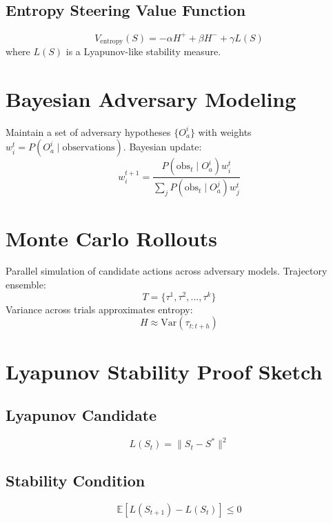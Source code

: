 \documentclass[12pt]{article}
\begin{document}
\subsection{Entropy Steering Value Function}
\begin{equation}
V_{\text{entropy}}(S) = -\alpha H^+ + \beta H^- + \gamma L(S)
\end{equation}
where $L(S)$ is a Lyapunov-like stability measure.

\section{Bayesian Adversary Modeling}
Maintain a set of adversary hypotheses $\{O_a^i\}$ with weights $w_i^t = P(O_a^i \mid \text{observations})$.
Bayesian update:
\begin{equation}
w_i^{t+1} = \frac{P(\text{obs}_t \mid O_a^i) w_i^t}{\sum_j P(\text{obs}_t \mid O_a^j) w_j^t}
\end{equation}

\section{Monte Carlo Rollouts}
Parallel simulation of candidate actions across adversary models.
Trajectory ensemble:
\begin{equation}
T = \{\tau^1, \tau^2, ..., \tau^k\}
\end{equation}
Variance across trials approximates entropy:
\begin{equation}
H \approx \text{Var}(\tau_{t:t+h})
\end{equation}

\section{Lyapunov Stability Proof Sketch}
\subsection{Lyapunov Candidate}
\begin{equation}
L(S_t) = \| S_t - S^* \|^2
\end{equation}

\subsection{Stability Condition}
\begin{equation}
\mathbb{E}[L(S_{t+1}) - L(S_t)] \le 0
\end{equation}
\end{document}
